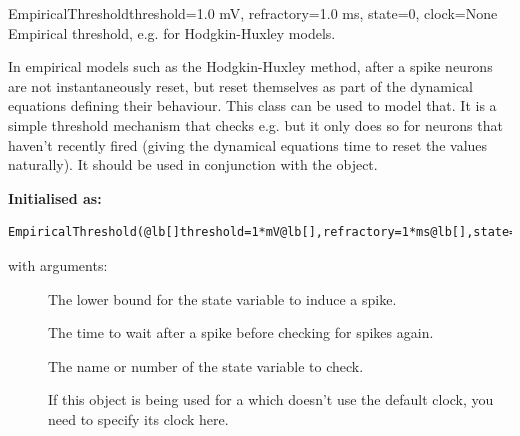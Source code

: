 \documentclass[letterpaper,10pt]{manual}
\begin{document}
\hypertarget{brian.EmpiricalThreshold}{}\begin{classdesc}{EmpiricalThreshold}{threshold=1.0 mV, refractory=1.0 ms, state=0, clock=None}
Empirical threshold, e.g. for Hodgkin-Huxley models.

In empirical models such as the Hodgkin-Huxley method, after a spike
neurons are not instantaneously reset, but reset themselves
as part of the dynamical equations defining their behaviour. This class
can be used to model that. It is a simple threshold mechanism that
checks e.g.  but it only does so for neurons that haven't
recently fired (giving the dynamical equations time to reset
the values naturally). It should be used in conjunction with the
\hyperlink{brian.NoReset}{} object.

\textbf{Initialised as:}

\begin{Verbatim}[commandchars=@\[\]]
EmpiricalThreshold(@lb[]threshold=1*mV@lb[],refractory=1*ms@lb[],state=0@lb[],clock@rb[]@rb[]@rb[]@rb[])
\end{Verbatim}

with arguments:
\begin{description}
\item[]
The lower bound for the state variable to induce a spike.

\item[]
The time to wait after a spike before checking for spikes again.

\item[]
The name or number of the state variable to check.

\item[]
If this object is being used for a \hyperlink{brian.NeuronGroup}{} which doesn't
use the default clock, you need to specify its clock here.

\end{description}
\end{classdesc}
\end{document}
